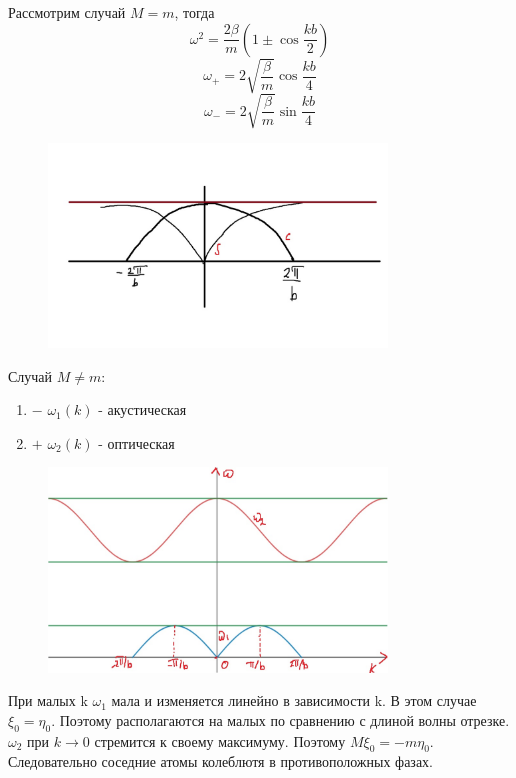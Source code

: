 \documentclass{beamer}
\begin{document}
\begin{frame}
	Рассмотрим случай $M = m$, тогда
	\begin{equation*}
		\omega^2 = \frac{2\beta}{m} (1 \pm \cos{\frac{kb}{2}})
	\end{equation*}
	$$
		\omega_{+} = 2\sqrt{\frac{\beta}{m}} \cos{\frac{kb}{4}}
	$$
	$$
		\omega_{-} = 2\sqrt{\frac{\beta}{m}} \sin{\frac{kb}{4}}
	$$
	\begin{figure}[ht!]
		\centering
		\includegraphics[width=90mm]{1.jpg}
	\end{figure}
\end{frame}
\begin{frame}
	Случай $M\neq m$:
	\begin{enumerate}
		\item $-$ $\omega_1(k)$ - акустическая
		\item $+$ $\omega_2(k)$ - оптическая
	\end{enumerate}
\begin{figure}[ht!]
	\centering
	\includegraphics[width=90mm]{2.jpg}
\end{figure}
\end{frame}
\begin{frame}
	При малых k $\omega_1$ мала и изменяется линейно в зависимости k. В этом случае $\xi_0 = \eta_0$. 
	Поэтому располагаются на малых по сравнению с длиной волны отрезке.\newline
	$\omega_2$ при $k\to 0$ стремится к своему максимуму. Поэтому $M\xi_0 = -m\eta_0$. Следовательно соседние атомы колеблютя в противоположных фазах.
\end{frame} 
\end{document}
